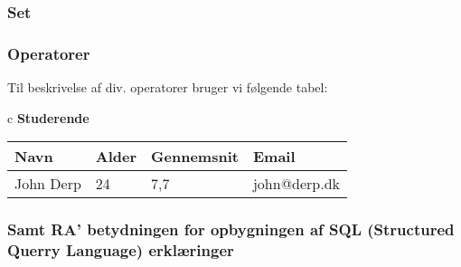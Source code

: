 \subsubsection{Set}

\subsubsection{Operatorer}

Til beskrivelse af div. operatorer bruger vi følgende tabel:

\setlength{\tabcolsep}{10pt}
\renewcommand{\arraystretch}{1.2}
\begin{center}
	\begin{tabular}{c}
		\textbf{\large Studerende}	\\
		\begin{tabular}{|l|l|l|l|}
			\hline
			\textbf{Navn}&\textbf{Alder}&\textbf{Gennemsnit}&\textbf{Email}\\
			\hline
			John Derp	& 24 & 7,7	& john@derp.dk		\\
			\hline
		\end{tabular}
	\end{tabular}
\end{center}



\subsubsection{Samt RA' betydningen for opbygningen af  SQL (Structured Querry Language) erklæringer}



















